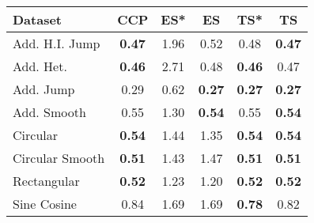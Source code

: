 \begin{tabular}{lccccc}
\toprule
Dataset & CCP & ES* & ES & TS* & TS \\
\midrule
Add. H.I. Jump & \textbf{0.47} & 1.96 & 0.52 & 0.48 & \textbf{0.47} \\
Add. Het. & \textbf{0.46} & 2.71 & 0.48 & \textbf{0.46} & 0.47 \\
Add. Jump & 0.29 & 0.62 & \textbf{0.27} & \textbf{0.27} & \textbf{0.27} \\
Add. Smooth & 0.55 & 1.30 & \textbf{0.54} & 0.55 & \textbf{0.54} \\
Circular & \textbf{0.54} & 1.44 & 1.35 & \textbf{0.54} & \textbf{0.54} \\
Circular Smooth & \textbf{0.51} & 1.43 & 1.47 & \textbf{0.51} & \textbf{0.51} \\
Rectangular & \textbf{0.52} & 1.23 & 1.20 & \textbf{0.52} & \textbf{0.52} \\
Sine Cosine & 0.84 & 1.69 & 1.69 & \textbf{0.78} & 0.82 \\
\bottomrule
\end{tabular}